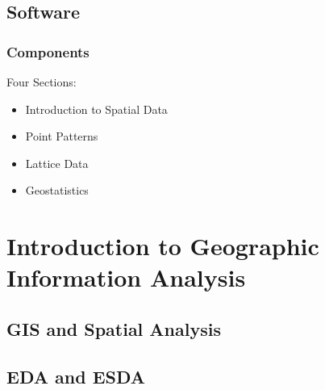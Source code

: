 \documentclass{beamer}
\begin{document}
\subsection{Software}


\begin{frame}
\frametitle{Components}

\begin{block}{{{Four Sections:}}}

\begin{itemize}
\item<2,6> Introduction to Spatial Data
\item<3,6> Point Patterns
\item<4,6> Lattice Data
\item<5,6> Geostatistics
\end{itemize}

\end{block}

\end{frame}

\section{Introduction to Geographic Information Analysis}


\subsection{GIS and Spatial Analysis}


\subsection{EDA and ESDA}
\end{document}
